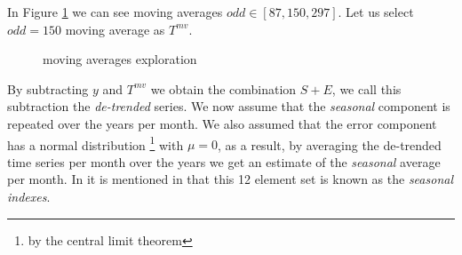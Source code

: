 In Figure \ref{fig:mv_2016_2019} we can see moving averages $odd \in [87,150,297]$. Let us select $odd=150$ moving average as $T^{mv}$. 

\begin{figure}[!htb]
	\caption{\label{fig:mv_2016_2019}  moving averages exploration}
\end{figure}

By subtracting $y$ and $T^{mv}$ we obtain the combination $S+E$, we call this subtraction the \textit{de-trended} series. We now assume that the \textit{seasonal} component is repeated over the years per month. We also assumed that the error component has a normal distribution \footnote{by the central limit theorem} with $\mu=0$, as a result, by averaging the de-trended time series per month over the years we get an estimate of the \textit{seasonal} average per month. In it is mentioned in \cite{makridakis2008forecasting} that this 12 element set is known as the \textit{seasonal indexes}.


